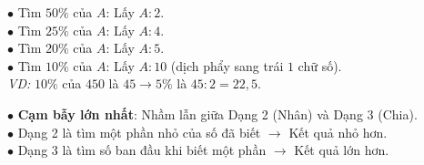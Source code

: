 \documentclass[14pt,a4paper,oneside]{extbook}
\begin{document}
\noindent
\begin{minipage}[t]{0.54\textwidth}
  \begin{tcolorbox}[
    enhanced,
    title={\footnotesize\bfseries\color{white}\faBolt\ Mẹo tính nhẩm phần trăm siêu tốc},
    colback=green!3!white,
    colframe=green!60!black,
    arc=2.5mm, boxrule=0.8pt, top=1.8mm, bottom=1.8mm, left=2.2mm, right=2.2mm
  ]
    \footnotesize
    $\bullet$ Tìm $50\%$ của $A$: Lấy $A : 2$.\\
    $\bullet$ Tìm $25\%$ của $A$: Lấy $A : 4$.\\
    $\bullet$ Tìm $20\%$ của $A$: Lấy $A : 5$.\\
    $\bullet$ Tìm $10\%$ của $A$: Lấy $A : 10$ (dịch phẩy sang trái $1$ chữ số).\\
    \textit{VD:} $10\%$ của $450$ là $45 \rightarrow 5\%$ là $45 : 2 = 22,5$.
  \end{tcolorbox}
\end{minipage}%
\hfill
\begin{minipage}[t]{0.44\textwidth}
  \begin{tcolorbox}[
    enhanced,
    title={\footnotesize\bfseries\color{white}\faExclamationTriangle\ Mẹo tránh bẫy trắc nghiệm},
    colback=red!2!white,
    colframe=red!70!black,
    arc=2.5mm, boxrule=0.8pt, top=1.8mm, bottom=1.8mm, left=2.2mm, right=2.2mm
  ]
    \footnotesize
    $\bullet$ \textbf{Cạm bẫy lớn nhất}: Nhầm lẫn giữa Dạng 2 (Nhân) và Dạng 3 (Chia).\\
    $\bullet$ Dạng 2 là tìm một phần nhỏ của số đã biết $\rightarrow$ Kết quả nhỏ hơn.\\
    $\bullet$ Dạng 3 là tìm số ban đầu khi biết một phần $\rightarrow$ Kết quả lớn hơn.
  \end{tcolorbox}
\end{minipage}
\end{document}
